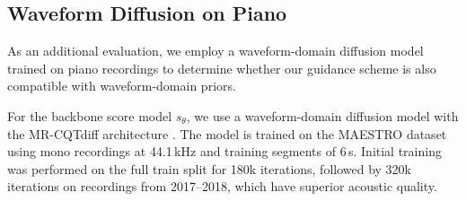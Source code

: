 \documentclass{article}
\begin{document}



\vspace{-5pt}
\subsection{Waveform Diffusion on Piano}
\vspace{-3pt}



As an additional evaluation, we employ a waveform-domain diffusion model trained on piano recordings to determine whether our guidance scheme is also compatible with waveform-domain priors.


For the backbone score model $s_\theta$, we use a waveform-domain diffusion model with the MR-CQTdiff architecture  \cite{dacosta2025mrcqtdiff}.
The model is trained on the MAESTRO dataset \cite{hawthorne_enabling_2019} using mono recordings at 44.1\,kHz and training segments of 6\,s. 
Initial training was performed on the full train split for 180k iterations, followed by 320k iterations on recordings from 2017–2018, which have superior acoustic quality.
\end{document}
